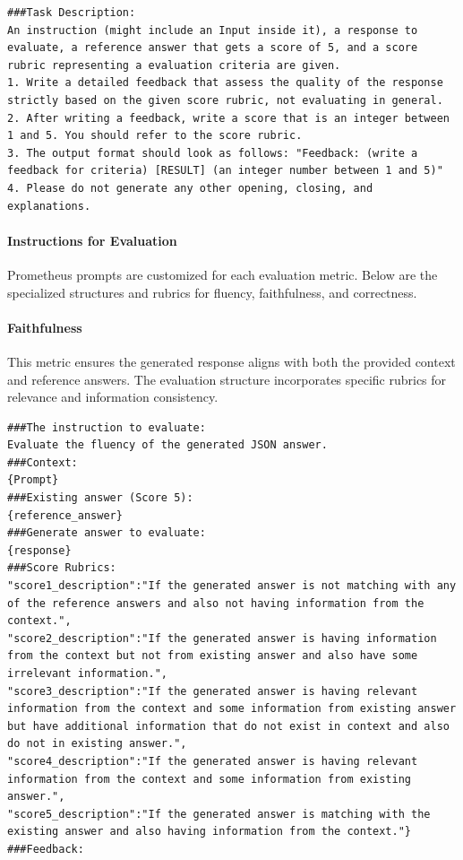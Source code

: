 \begin{lstlisting}[style=textstyle, frame = single, caption=Task description used for evaluation of fluency and correctness \citep{kim2024prometheus2opensource}, label=code:Task-description-fluency-correctness]
###Task Description:
An instruction (might include an Input inside it), a response to evaluate, a reference answer that gets a score of 5, and a score rubric representing a evaluation criteria are given.
1. Write a detailed feedback that assess the quality of the response strictly based on the given score rubric, not evaluating in general.
2. After writing a feedback, write a score that is an integer between 1 and 5. You should refer to the score rubric.
3. The output format should look as follows: "Feedback: (write a feedback for criteria) [RESULT] (an integer number between 1 and 5)"
4. Please do not generate any other opening, closing, and explanations.
\end{lstlisting}

\paragraph{Instructions for Evaluation}

Prometheus prompts are customized for each evaluation metric. Below are the specialized structures and rubrics for fluency, faithfulness, and correctness.

\paragraph{Faithfulness}
This metric ensures the generated response aligns with both the provided context and reference answers. The evaluation structure incorporates specific rubrics for relevance and information consistency.

\begin{lstlisting}[style=textstyle, frame = single, caption=Prompt structured correctness \citep{kim2024prometheus2opensource}, label=code:estructured-faithfulness]
###The instruction to evaluate:
Evaluate the fluency of the generated JSON answer.
###Context:
{Prompt}
###Existing answer (Score 5):
{reference_answer}
###Generate answer to evaluate:
{response}
###Score Rubrics:
"score1_description":"If the generated answer is not matching with any of the reference answers and also not having information from the context.",
"score2_description":"If the generated answer is having information from the context but not from existing answer and also have some irrelevant information.",
"score3_description":"If the generated answer is having relevant information from the context and some information from existing answer but have additional information that do not exist in context and also do not in existing answer.",
"score4_description":"If the generated answer is having relevant information from the context and some information from existing answer.",
"score5_description":"If the generated answer is matching with the existing answer and also having information from the context."}
###Feedback:
\end{lstlisting}

